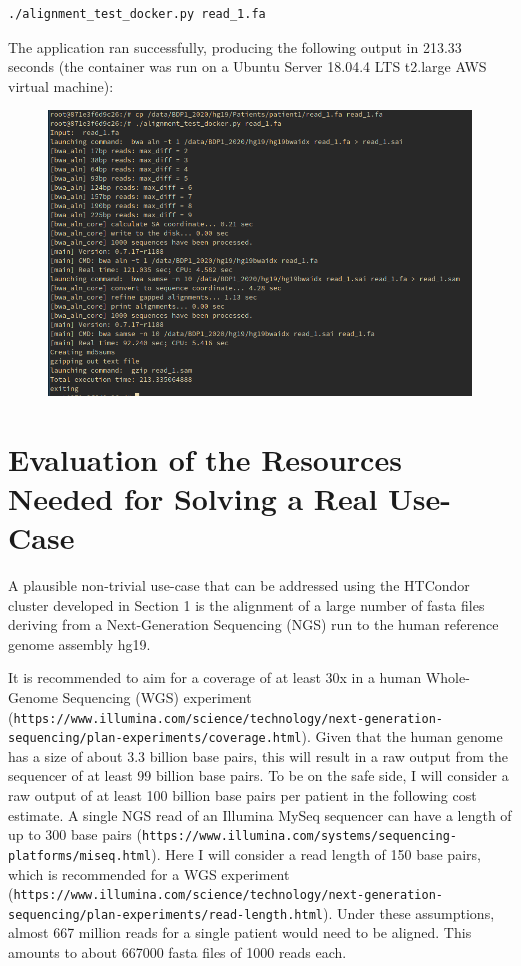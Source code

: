 \documentclass{article}
\begin{document}
\begin{lstlisting}
./alignment_test_docker.py read_1.fa
\end{lstlisting}

The application ran successfully, producing the following output in 213.33 seconds (the container was run on a Ubuntu Server 18.04.4 LTS t2.large AWS virtual machine):

\begin{figure}[!h]
    \center
    \includegraphics[width=\textwidth]{./images/docker_test_out.png}
\end{figure}

\section{Evaluation of the Resources Needed for Solving a Real Use-Case}
A plausible non-trivial use-case that can be addressed using the HTCondor cluster developed in Section 1 is the alignment of a large number of fasta files deriving from a Next-Generation Sequencing (NGS) run to the human reference genome assembly hg19.

It is recommended to aim for a coverage of at least 30x in a human Whole-Genome Sequencing (WGS) experiment (\texttt{https://www.illumina.com/science/technology/next-generation-sequencing/plan-experiments/coverage.html}).
Given that the human genome has a size of about 3.3 billion base pairs, this will result in a raw output from the sequencer of at least 99 billion base pairs.
To be on the safe side, I will consider a raw output of at least 100 billion base pairs per patient in the following cost estimate.
A single NGS read of an Illumina MySeq sequencer can have a length of up to 300 base pairs (\texttt{https://www.illumina.com/systems/sequencing-platforms/miseq.html}). Here I will consider a read length of 150 base pairs, which is recommended for a WGS experiment (\texttt{https://www.illumina.com/science/technology/next-generation-sequencing/plan-experiments/read-length.html}).
Under these assumptions, almost 667 million reads for a single patient would need to be aligned.
This amounts to about 667000 fasta files of 1000 reads each.
\end{document}
